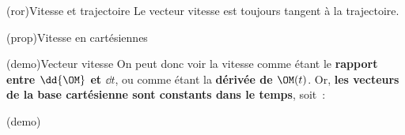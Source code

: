 \documentclass[../../main/main.tex]{subfiles}
\begin{document}
\begin{tcb}[sidebyside, righthand ratio=.25]
\begin{center}
{		}
		\vspace{-15pt}
		\captionsetup{justification=centering}
	\end{center}
\end{tcb}

\begin{tcb}(ror){Vitesse et trajectoire}
	Le vecteur vitesse est toujours tangent à la trajectoire.
\end{tcb}

\begin{tcb*}(prop){Vitesse en cartésiennes}
	\psw{%
		\[
			\vf(t) = \xp(t)\ux + \yp(t)\uy + \zp(t)\uz
		\]
	}%
	\vspace{-15pt}
\end{tcb*}

\begin{tcb*}(demo){Vecteur vitesse}
	On peut donc voir la vitesse comme étant le \textbf{rapport entre $\dd{\OM}$
		et $\dd{t}$}, ou comme étant la \textbf{dérivée de $\OM(t)$}. Or, \textbf{les
		vecteurs de la base cartésienne sont constants dans le temps}, soit~:
	\smallbreak
	\begin{isd}(demo)
		\tcblower
	\end{isd}
\end{tcb*}

\end{document}
